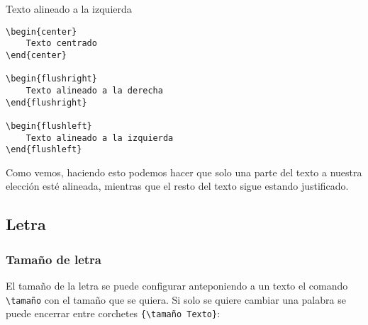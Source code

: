 	\begin{flushleft}
		Texto alineado a la izquierda
	\end{flushleft}
	
	\begin{myquote}
		\begin{lstlisting}
\begin{center}
	Texto centrado
\end{center}

\begin{flushright}
	Texto alineado a la derecha
\end{flushright}

\begin{flushleft}
	Texto alineado a la izquierda
\end{flushleft}
		\end{lstlisting}
	\end{myquote}
	
	
	Como vemos, haciendo esto podemos hacer que solo una parte del texto a nuestra elección esté alineada, mientras que el resto del texto sigue estando justificado.
	
		\subsection{Letra}	
	
	\subsubsection{Tamaño de letra}
	
	El tamaño de la letra se puede configurar anteponiendo a un texto el comando \verb|\tamaño| con el tamaño que se quiera. Si solo se quiere cambiar una palabra se puede encerrar entre corchetes \verb|{\tamaño Texto}|:\\
	
